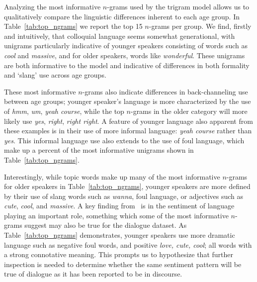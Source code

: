 Analyzing the most informative $n$-grams 
used by the trigram model
allows us to qualitatively compare the linguistic differences inherent to each age group. In Table~\ref{tab:top_ngrams} we report the top 15 $n$-grams per group.
We find, firstly and intuitively, that colloquial language seems somewhat generational, with unigrams particularly indicative of younger speakers consisting of words such as 
\emph{cool} and \emph{massive}, and
for older speakers, words like
\emph{wonderful}.
These unigrams are both informative to the model and indicative of differences in both formality and `slang' use across age groups.

These most informative $n$-grams also indicate differences in back-channeling use between age groups; younger speaker's language is more characterized by the use of \emph{hmm}, \emph{um}, \emph{yeah course}, while the top $n$-grams in the older category will more likely use
\emph{yes}, \emph{right}, \emph{right right}.
A feature of younger language also apparent from these examples is in their use of more informal language: \emph{yeah course} rather than \emph{yes}.
This informal language use also extends to the use of foul language, which make up a percent of the most informative unigrams shown in Table~\ref{tab:top_ngrams}. %

Interestingly, while topic words make up many of the most informative $n$-grams for older speakers in Table~\ref{tab:top_ngrams}, younger speakers are more defined by their use of slang words such as \textit{wanna}, foul language, or adjectives such as \textit{cute}, \emph{cool}, and \emph{massive}.
A key finding from~\citet{schler2006effects} is in the sentiment of language playing an important role, something which some of the most informative $n$-grams suggest may also be true for the dialogue dataset. As Table~\ref{tab:top_ngrams} demonstrates, younger speakers use more dramatic language %
such as negative foul words, and positive \textit{love, cute, cool}; all words with a strong connotative meaning. 
This prompts us to hypothesize that further inspection is needed to determine whether the same sentiment pattern will be true of dialogue as it has been reported to be in discourse.

